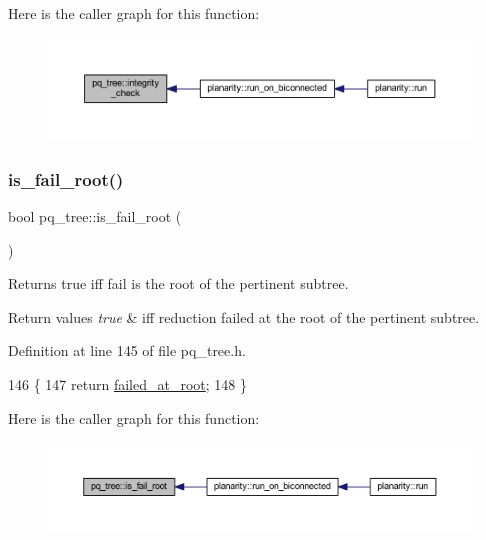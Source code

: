 Here is the caller graph for this function\+:\nopagebreak
\begin{figure}[H]
\begin{center}
\leavevmode
\includegraphics[width=350pt]{classpq__tree_a170813af06d7b02083c3a7785e080de5_icgraph}
\end{center}
\end{figure}
\mbox{\label{classpq__tree_ab320f9d84cba3198a95cc5f33fde0813}} 
\subsubsection{\texorpdfstring{is\+\_\+fail\+\_\+root()}{is\_fail\_root()}}
{\footnotesize\ttfamily bool pq\+\_\+tree\+::is\+\_\+fail\+\_\+root (\begin{DoxyParamCaption}{ }\end{DoxyParamCaption})\hspace{0.3cm}{\ttfamily [inline]}}



Returns true iff fail is the root of the pertinent subtree. 


\begin{DoxyRetVals}{Return values}
{\em true} & iff reduction failed at the root of the pertinent subtree. \\
\hline
\end{DoxyRetVals}


Definition at line 145 of file pq\+\_\+tree.\+h.


\begin{DoxyCode}
146     \{
147     \textcolor{keywordflow}{return} \mbox{\hyperlink{classpq__tree_a5ed4fd9eead5a983afc5e449debe73e2}{failed\_at\_root}};
148     \}
\end{DoxyCode}
Here is the caller graph for this function\+:\nopagebreak
\begin{figure}[H]
\begin{center}
\leavevmode
\includegraphics[width=350pt]{classpq__tree_ab320f9d84cba3198a95cc5f33fde0813_icgraph}
\end{center}
\end{figure}
\mbox{\label{classpq__tree_aa2c33ce6225a761119a1ea00b91753db}} 
